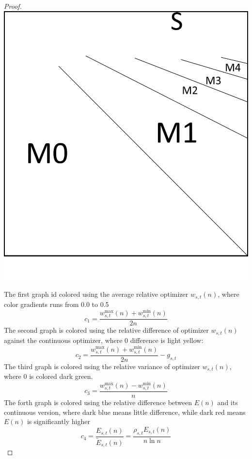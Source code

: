 \documentclass[]{article}
\begin{document}
\begin{proof}
	\vspace{0.3cm}
	
	\includegraphics[scale=0.3]{mode.png}
	
	The first graph id colored using the average relative optimizer $w_{s,t}(n)$, where color gradients runs from 0.0 to 0.5
	\[
	c_1 = \frac{w^{\max}_{s,t}(n) + w^{\min}_{s,t}(n)}{2n}
	\]
	The second graph is colored using the relative difference of optimizer $w_{s,t}(n)$ against the continuous optimizer, where 0 difference is light yellow:
	\[
	c_2 = \frac{w^{\max}_{s,t}(n) + w^{\min}_{s,t}(n)}{2n} - g_{s,t}
	\]  
	The third graph is colored using the relative variance of optimizer $w_{s,t}(n)$, where 0 is colored dark green.
	\[
	c_3 = \frac{w^{\max}_{s,t}(n) - w^{\min}_{s,t}(n)}{n}
	\]
	The forth graph is colored using the relative difference between $E(n)$ and its continuous version, where dark blue means little difference, while dark red means $E(n)$ is significantly higher
	\[
	c_4 =\frac{E_{s,t}(n)} {\tilde{E}_{s,t}(n)} = \frac{\rho_{s,t} E_{s,t}(n)} {n \ln n}
	\]
	

\end{proof}
\end{document}
